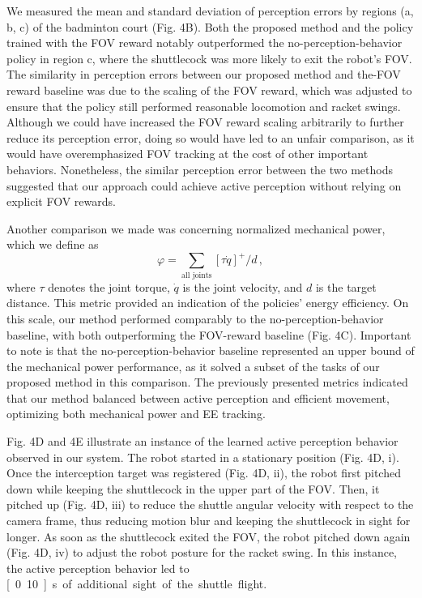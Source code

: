 \documentclass[9pt,twocolumn,twoside]{osajnl}
\begin{document}
We measured the mean and standard deviation of perception errors by regions (a, b, c) of the badminton court (Fig. 4B). Both the proposed method and the policy trained with the \ac{FOV} reward notably outperformed the no-perception-behavior policy in region c, where the shuttlecock was more likely to exit the robot's \ac{FOV}. The similarity in perception errors between our proposed method and the-\ac{FOV} reward baseline was due to the scaling of the \ac{FOV} reward, which was adjusted to ensure that the policy still performed reasonable locomotion and racket swings. Although we could have increased the \ac{FOV} reward scaling arbitrarily to further reduce its perception error, doing so would have led to an unfair comparison, as it would have overemphasized \ac{FOV} tracking at the cost of other important behaviors. Nonetheless, the similar perception error between the two methods suggested that our approach could achieve active perception without relying on explicit \ac{FOV} rewards.

Another comparison we made was concerning normalized mechanical power, which we define as
\begin{equation}
    \varphi = \sum_{\text{all joints}} [\tau \Dot{q}]^{+}/d\,,
\end{equation}
where $\tau$ denotes the joint torque, $\Dot{q}$ is the joint velocity, and $d$ is the target distance. This metric provided an indication of the policies' energy efficiency. On this scale, our method performed comparably to the no-perception-behavior baseline, with both outperforming the \ac{FOV}-reward baseline (Fig. 4C). Important to note is that the no-perception-behavior baseline represented an upper bound of the mechanical power performance, as it solved a subset of the tasks of our proposed method in this comparison. The previously presented metrics indicated that our method balanced between active perception and efficient movement, optimizing both mechanical power and \ac{EE} tracking.

Fig. 4D and 4E illustrate an instance of the learned active perception behavior observed in our system. The robot started in a stationary position (Fig. 4D, i). Once the interception target was registered (Fig. 4D, ii), the robot first pitched down while keeping the shuttlecock in the upper part of the \ac{FOV}. Then, it pitched up (Fig. 4D, iii) to reduce the shuttle angular velocity with respect to the camera frame, thus reducing motion blur and keeping the shuttlecock in sight for longer. As soon as the shuttlecock exited the \ac{FOV}, the robot pitched down again (Fig. 4D, iv) to adjust the robot posture for the racket swing. In this instance, the active perception behavior led to \unit[0.10]{s} of additional sight of the shuttle flight. 
\end{document}
